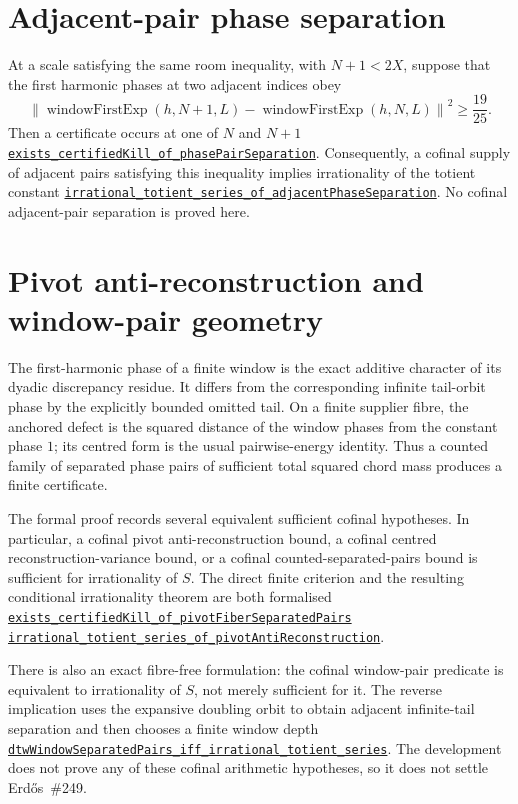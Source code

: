 \documentclass[11pt]{article}
\newcommand{\commit}{81150c1c6fdd4cd51e76d3aa0de344341e0e9e7c}
\newcommand{\repobase}{https://github.com/wcook04/plectis-lean-erdos249-257/blob/\commit}
\newcommand{\PK}{Erdos249257}
\newcommand{\lref}[3]{\href{\repobase/\PK/#1\#L#2}{\nolinkurl{#3}}}
\theoremstyle{remark}\newtheorem*{remark}{Remark}
\begin{document}
\section{Adjacent-pair phase separation}\label{sec:adjacentphase}
At a scale satisfying the same room inequality, with $N+1<2X$, suppose that
the first harmonic phases at two adjacent indices obey
\[
 \left\lVert
 \operatorname{windowFirstExp}(h,N+1,L)-\operatorname{windowFirstExp}(h,N,L)
 \right\rVert^2\ge\frac{19}{25}.
\]
Then a certificate occurs at one of $N$ and $N+1$
\lref{AdjacentPhaseSeparation.lean}{258}{exists_certifiedKill_of_phasePairSeparation}.
Consequently, a cofinal supply of adjacent pairs satisfying this inequality
implies irrationality of the totient constant
\lref{AdjacentPhaseSeparation.lean}{295}{irrational_totient_series_of_adjacentPhaseSeparation}.
No cofinal adjacent-pair separation is proved here.

\section{Pivot anti-reconstruction and window-pair geometry}\label{sec:pivot}
The first-harmonic phase of a finite window is the exact additive character of
its dyadic discrepancy residue.  It differs from the corresponding infinite
tail-orbit phase by the explicitly bounded omitted tail.  On a finite supplier
fibre, the anchored defect is the squared distance of the window phases from
the constant phase $1$; its centred form is the usual pairwise-energy identity.
Thus a counted family of separated phase pairs of sufficient total squared
chord mass produces a finite certificate.

The formal proof records several equivalent sufficient cofinal hypotheses.  In
particular, a cofinal pivot
anti-reconstruction bound, a cofinal centred reconstruction-variance bound, or
a cofinal counted-separated-pairs bound is sufficient for irrationality of
$S$. The direct finite criterion and the resulting conditional irrationality
theorem are both formalised
\lref{PivotAntiReconstruction.lean}{1105}{exists_certifiedKill_of_pivotFiberSeparatedPairs}
\lref{PivotAntiReconstruction.lean}{1502}{irrational_totient_series_of_pivotAntiReconstruction}.

There is also an exact fibre-free formulation: the cofinal window-pair
predicate is equivalent to irrationality of $S$, not merely sufficient for it.
The reverse implication uses the expansive doubling orbit to obtain adjacent
infinite-tail separation and then chooses a finite window depth
\lref{PivotAntiReconstruction.lean}{1744}{dtwWindowSeparatedPairs_iff_irrational_totient_series}.
The development does not prove any of these cofinal arithmetic hypotheses, so it does
not settle Erd\H{o}s~\#249.
\end{document}
